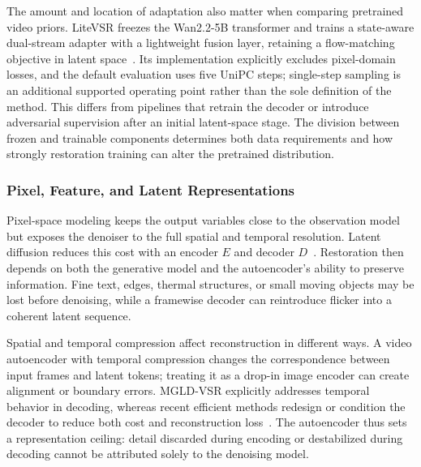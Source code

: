 The amount and location of adaptation also matter when comparing pretrained video priors. LiteVSR freezes the Wan2.2-5B transformer and trains a state-aware dual-stream adapter with a lightweight fusion layer, retaining a flow-matching objective in latent space~\cite{litevsr}. Its implementation explicitly excludes pixel-domain losses, and the default evaluation uses five UniPC steps; single-step sampling is an additional supported operating point rather than the sole definition of the method. This differs from pipelines that retrain the decoder or introduce adversarial supervision after an initial latent-space stage. The division between frozen and trainable components determines both data requirements and how strongly restoration training can alter the pretrained distribution.

\subsubsection{Pixel, Feature, and Latent Representations}
Pixel-space modeling keeps the output variables close to the observation model but exposes the denoiser to the full spatial and temporal resolution. Latent diffusion reduces this cost with an encoder $E$ and decoder $D$~\cite{ldm}. Restoration then depends on both the generative model and the autoencoder's ability to preserve information. Fine text, edges, thermal structures, or small moving objects may be lost before denoising, while a framewise decoder can reintroduce flicker into a coherent latent sequence.

Spatial and temporal compression affect reconstruction in different ways. A video autoencoder with temporal compression changes the correspondence between input frames and latent tokens; treating it as a drop-in image encoder can create alignment or boundary errors. MGLD-VSR explicitly addresses temporal behavior in decoding, whereas recent efficient methods redesign or condition the decoder to reduce both cost and reconstruction loss~\cite{mgld,flash,swiftvr}. The autoencoder thus sets a representation ceiling: detail discarded during encoding or destabilized during decoding cannot be attributed solely to the denoising model.

